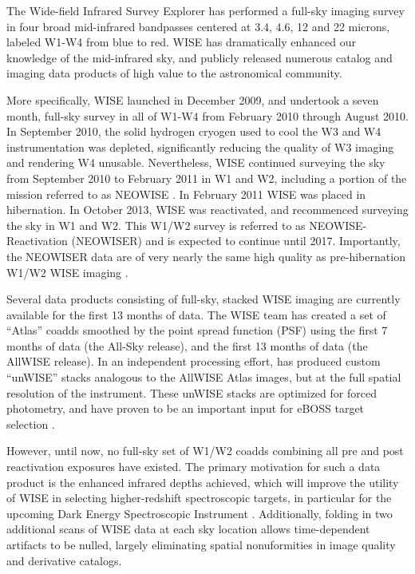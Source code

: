 \documentclass{emulateapj}
\begin{document}
The Wide-field Infrared Survey Explorer \cite[WISE; ][]{wright10} has performed
a full-sky imaging survey in four broad mid-infrared bandpasses centered at 
3.4, 4.6, 12 and 22 microns, labeled W1-W4 from blue to red. WISE has 
dramatically enhanced our knowledge of the mid-infrared sky, and publicly 
released numerous catalog and imaging data products of high value to the 
astronomical community.

More specifically, WISE launched in December 2009, and undertook a seven 
month, full-sky survey in all of W1-W4 from February 2010 through August
2010. In September 2010, the solid hydrogen cryogen used to cool the W3 and W4 
instrumentation was depleted, significantly reducing the quality of W3 
imaging and rendering W4 unusable. Nevertheless, WISE continued surveying 
the sky from September 2010 to February 2011 in W1 and W2, including 
a portion of the mission referred to as NEOWISE \citep{neowise}. In February 
2011 WISE was placed in hibernation. In October 2013, WISE was reactivated, and
recommenced surveying the sky in W1 and W2. This W1/W2 survey is referred to as 
NEOWISE-Reactivation (NEOWISER) and is expected to continue until 2017.
Importantly, the NEOWISER data are of very nearly the same high quality as
pre-hibernation W1/W2 WISE imaging \citep{neowiser}.

Several data products consisting of full-sky, stacked WISE imaging
are currently available for the first 13 months of data.
The WISE team has created a set
of ``Atlas'' coadds smoothed by the point spread function (PSF)
using the first 7 months of data (the All-Sky release), and the first
13 months of data (the AllWISE release).
In an independent processing effort, \cite{lang14} has 
produced custom ``unWISE'' stacks analogous to the AllWISE Atlas images,
but at the full spatial resolution of the instrument. These unWISE
stacks are optimized for forced photometry, and have proven to be 
an important input for eBOSS target selection 
\citep{lang14b, eboss_qso, eboss_lrg}.

However, until now, no full-sky set of W1/W2 coadds combining
all pre and post reactivation exposures have existed. The primary motivation
for such a data product is the enhanced infrared depths achieved, which
will improve the utility of WISE in selecting higher-redshift 
spectroscopic targets, in particular for the upcoming
Dark Energy Spectroscopic Instrument \citep[DESI,][]{desi}. Additionally, 
folding in two additional scans of WISE data at each sky location allows 
time-dependent artifacts to be nulled, largely eliminating spatial 
nonuformities in image quality and derivative catalogs.
\end{document}
